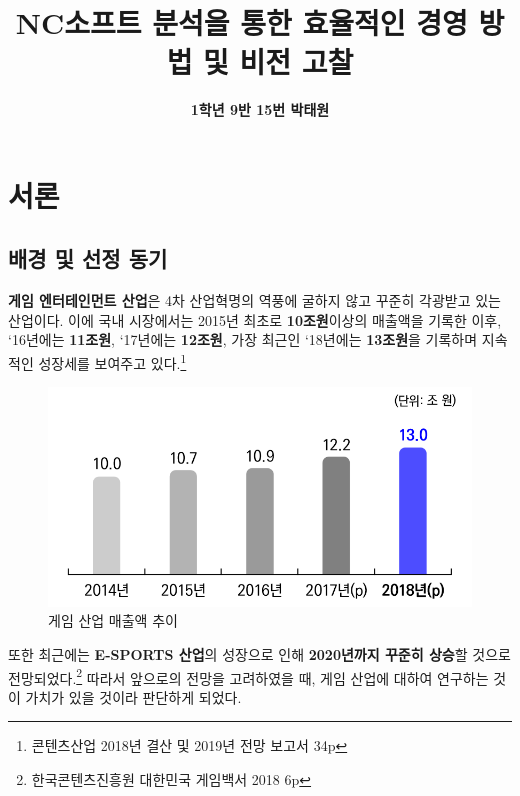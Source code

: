 \documentclass[11pt]{oblivoir}
\title{\textbf{NC소프트 분석을 통한 효율적인 경영 방법 및 비전 고찰}}
\author{\textbf{1학년 9반 15번 박태원}}
\begin{document}
	\maketitle
	
	\begin{center}
	\tableofcontents
	\pagebreak
	\end{center}

	\begin{abstract}
	
	\end{abstract}

	\section{서론}
		\subsection{배경 및 선정 동기}
			\textbf{게임 엔터테인먼트 산업}은 4차 산업혁명의 역풍에 굴하지 않고 꾸준히 각광받고 있는 산업이다. 이에 국내 시장에서는 2015년 최초로 \textbf{10조원}이상의 매출액을 기록한 이후, `16년에는 \textbf{11조원}, `17년에는 \textbf{12조원}, 가장 최근인 `18년에는 \textbf{13조원}을 기록하며 지속적인 성장세를 보여주고 있다.\footnote{콘텐츠산업 2018년 결산 및 2019년 전망 보고서 34p}
			
			\begin{figure}[htbp]
				\centering
				\includegraphics[width=1\textwidth]{GameMaechul.png}
				\caption{게임 산업 매출액 추이}
			\end{figure}
			
			또한 최근에는 \textbf{E-SPORTS 산업}의 성장으로 인해 \textbf{2020년까지 꾸준히 상승}할 것으로 전망되었다.\footnote{한국콘텐츠진흥원 대한민국 게임백서 2018 6p} 
			따라서 앞으로의 전망을 고려하였을 때, 게임 산업에 대하여 연구하는 것이 가치가 있을 것이라 판단하게 되었다.
			
\end{document}
